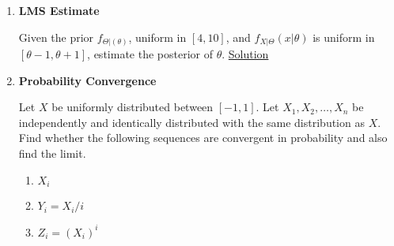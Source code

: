 \documentclass[11pt, a4paper]{article}
\begin{document}
\begin{enumerate}
    \item \hypertarget{q_lmsestimate}{\textbf{LMS Estimate}}\newline
    Given the prior $f_{\Theta|(\theta)}$, uniform in $[4,10]$, and $f_{X|\Theta}(x|\theta)$ is uniform in $[\theta-1, \theta+1]$, estimate the posterior of $\theta$. \hyperlink{a_lmsestimate}{Solution}

    \item \hypertarget{q_convergence}{\textbf{Probability Convergence}}\newline
    Let $X$ be uniformly distributed between $[-1,1]$. Let $X_{1}, X_{2},\ldots,X_{n}$ be independently and identically distributed with the same distribution as $X$. Find whether the following sequences are convergent in probability and also find the limit.
    \begin{enumerate}
        \item $X_{i}$
        \item $Y_{i} = X_{i}/i$
        \item $Z_{i} = (X_{i})^{i}$
    \end{enumerate}

    \end{enumerate}
\end{document}
